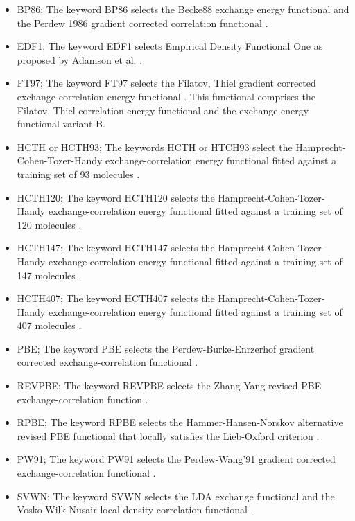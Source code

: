 \documentclass[11pt,fleqn]{article}
\begin{document}
\begin{itemize}
\item BP86;
The keyword BP86 selects the Becke88 exchange energy functional
\cite{becke88} and the Perdew 1986 gradient corrected correlation functional
\cite{perdew86}.

\item EDF1;
The keyword EDF1 selects Empirical Density Functional One as proposed by 
Adamson et al. \cite{adamson98}.

\item FT97;
The keyword FT97 selects the Filatov, Thiel gradient corrected 
exchange-correlation energy functional \cite{filatov97c,filatov97x}. 
This functional comprises 
the Filatov, Thiel correlation energy functional and the exchange energy 
functional variant B.

\item HCTH or HCTH93;
The keywords HCTH or HTCH93 select the Hamprecht-Cohen-Tozer-Handy
exchange-correlation energy functional fitted against a training set of
93 molecules \cite{hamprecht98}.

\item HCTH120;
The keyword HCTH120 selects the Hamprecht-Cohen-Tozer-Handy
exchange-correlation energy functional fitted against a training set of
120 molecules \cite{boese00}.

\item HCTH147;
The keyword HCTH147 selects the Hamprecht-Cohen-Tozer-Handy
exchange-correlation energy functional fitted against a training set of
147 molecules \cite{boese00}.

\item HCTH407;
The keyword HCTH407 selects the Hamprecht-Cohen-Tozer-Handy
exchange-correlation energy functional fitted against a training set of
407 molecules \cite{boese01}.

\item PBE;
The keyword PBE selects the Perdew-Burke-Enrzerhof gradient corrected 
exchange-correlation functional \cite{perdew96}.

\item REVPBE;
The keyword REVPBE selects the Zhang-Yang revised PBE exchange-correlation
function \cite{zhang98}.

\item RPBE;
The keyword RPBE selects the Hammer-Hansen-N{\/o}rskov alternative revised
PBE functional that locally satisfies the Lieb-Oxford criterion
\cite{hammer99}.

\item PW91;
The keyword PW91 selects the Perdew-Wang'91 gradient corrected
exchange-correlation functional \cite{perdew92}.

\item SVWN;
The keyword SVWN selects the LDA exchange functional and the 
Vosko-Wilk-Nusair local density correlation functional \cite{vosko80}.

\end{itemize}
\end{document}
